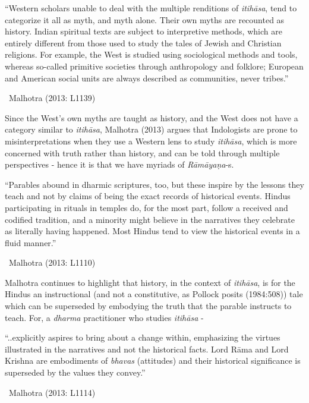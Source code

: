 \begin{myquote}
“Western scholars unable to deal with the multiple renditions of \textit{itihāsa}, tend to categorize it all as myth, and myth alone. Their own myths are recounted as history. Indian spiritual texts are subject to interpretive methods, which are entirely different from those used to study the tales of Jewish and Christian religions. For example, the West is studied using sociological methods and tools, whereas so-called primitive societies through anthropology and folklore; European and American social units are always described as communities, never tribes.”

~\hfill Malhotra (2013: L1139)
\end{myquote}

Since the West’s own myths are taught as history, and the West does not have a category similar to \textit{itihāsa}, Malhotra (2013) argues that Indologists are prone to misinterpretations when they use a Western lens to study \textit{itihāsa}, which is more concerned with truth rather than history, and can be told through multiple perspectives - hence it is that we have myriads of \textit{Rāmāyaṇa}-s.

\begin{myquote}
“Parables abound in dharmic scriptures, too, but these inspire by the lessons they teach and not by claims of being the exact records of historical events. Hindus participating in rituals in temples do, for the most part, follow a received and codified tradition, and a minority might believe in the narratives they celebrate as literally having happened. Most Hindus tend to view the historical events in a fluid manner.”

~\hfill Malhotra (2013: L1110)
\end{myquote}

Malhotra continues to highlight that history, in the context of \textit{itihāsa}, is for the Hindus an instructional (and not a constitutive, as Pollock posits (1984:508)) tale which can be superseded by embodying the truth that the parable instructs to teach. For, a \textit{dharma} practitioner who studies \textit{itihāsa} -

\begin{myquote}
“..explicitly aspires to bring about a change within, emphasizing the virtues illustrated in the narratives and not the historical facts. Lord Rāma and Lord Krishna are embodiments of \textit{bhavas} (attitudes) and their historical significance is superseded by the values they convey.”

~\hfill Malhotra (2013: L1114)
\end{myquote}

